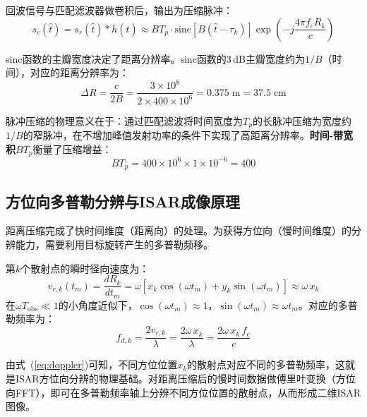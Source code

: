 \documentclass[12pt, a4paper]{article}
\begin{document}
回波信号与匹配滤波器做卷积后，输出为压缩脉冲：
\begin{equation}
  s_c(\hat{t}) = s_r(\hat{t}) * h(\hat{t})
  \approx B T_p \cdot \mathrm{sinc}\!\left[B\!\left(\hat{t} - \tau_k\right)\right]
  \exp\!\left(-j\frac{4\pi f_c R_k}{c}\right)
  \label{eq:pulse_compression}
\end{equation}

sinc函数的主瓣宽度决定了距离分辨率。$\mathrm{sinc}$函数的3\,dB主瓣宽度约为$1/B$（时间），对应的距离分辨率为：
\begin{equation}
  \boxed{\Delta R = \frac{c}{2B} = \frac{3\times 10^8}{2\times 400\times 10^6} = 0.375\;\text{m} = 37.5\;\text{cm}}
  \label{eq:range_res}
\end{equation}

脉冲压缩的物理意义在于：通过匹配滤波将时间宽度为$T_p$的长脉冲压缩为宽度约$1/B$的窄脉冲，在不增加峰值发射功率的条件下实现了高距离分辨率。\textbf{时间-带宽积}$BT_p$衡量了压缩增益：
\begin{equation}
  BT_p = 400\times 10^6 \times 1\times 10^{-6} = 400
  \label{eq:tbp}
\end{equation}

\subsection{方位向多普勒分辨与ISAR成像原理}
\label{subsec:azimuth}

距离压缩完成了快时间维度（距离向）的处理。为获得方位向（慢时间维度）的分辨能力，需要利用目标旋转产生的多普勒频移。

第$k$个散射点的瞬时径向速度为：
\begin{equation}
  v_{r,k}(t_m) = \frac{dR_k}{dt_m} = \omega\!\left[x_k\cos(\omega t_m) + y_k\sin(\omega t_m)\right] \approx \omega\, x_k
  \label{eq:radial_velocity}
\end{equation}
在$\omega T_{\mathrm{obs}} \ll 1$的小角度近似下，$\cos(\omega t_m) \approx 1$，$\sin(\omega t_m) \approx \omega t_m$。对应的多普勒频率为：
\begin{equation}
  f_{d,k} = \frac{2 v_{r,k}}{\lambda} = \frac{2\omega\, x_k}{\lambda}
  = \frac{2\omega\, x_k\, f_c}{c}
  \label{eq:doppler}
\end{equation}

由式~(\ref{eq:doppler})可知，不同方位位置$x_k$的散射点对应不同的多普勒频率，这就是ISAR方位向分辨的物理基础。对距离压缩后的慢时间数据做傅里叶变换（方位向FFT），即可在多普勒频率轴上分辨不同方位位置的散射点，从而形成二维ISAR图像。
\end{document}
